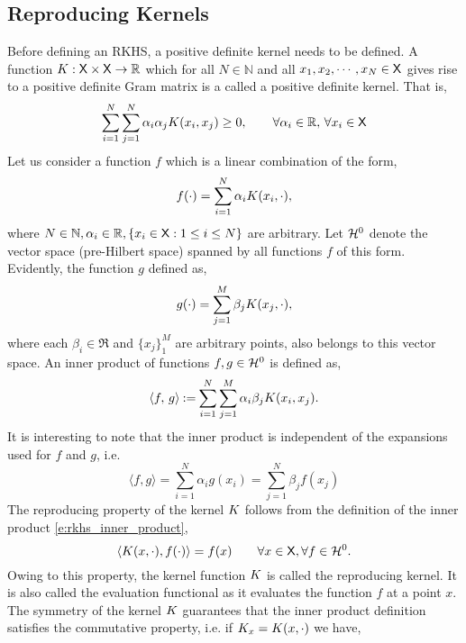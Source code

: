 \subsection{Reproducing Kernels} 
Before defining an RKHS, a positive definite kernel needs to be defined. A function $K : {\sf X} \times {\sf X} \to \mathbb{R}$ which for all $N \in \mathbb{N}$ and all $x_1,x_2,\cdots,x_N \in {\sf X}$ gives rise to a positive definite Gram matrix is a called a positive definite kernel. That is, 
\begin{equation}
\sum_{i=1}^N \sum_{j=1}^N \alpha_i \alpha_j K(x_i,x_j) \geq 0, \qquad \forall \alpha_i \in \mathbb{R}, \, \forall x_i \in {\sf X} 
\end{equation}
Let us consider a function $f$ which is a linear combination of the form,
\begin{equation}
f(\cdot) = \sum_{i=1}^N \alpha_i \Kern(x_i, \cdot),
\label{e:f_rkhs}
\end{equation}
where $N \in \mathbb{N}, \alpha_i \in \mathbb{R}, \{ x_i \in {\sf X}: 1\leq i \leq N \}$ are arbitrary. Let ${\cal H}^0$ denote the vector space (pre-Hilbert space) spanned by all functions $f$ of this form. Evidently, the function $g$ defined as,  
\begin{equation}
g(\cdot) = \sum_{j=1}^M \beta_j \Kern(x_j, \cdot),
\label{e:g_rkhs}
\end{equation}
where each $\beta_i \in \Re$ and $\{x_j\}_1^M$ are arbitrary points, also belongs to this vector space.  An inner product of functions $f,g \in {\cal H}^0$ is defined as,
\begin{equation}
\langle f,\, g \rangle \eqdef \sum_{i=1}^N \sum_{j=1}^M \alpha_i \beta_j \Kern(x_i, x_j).
\label{e:rkhs_inner_product}
\end{equation}
It is interesting to note that the inner product is independent of the expansions used for $f$ and $g$, i.e.
\begin{equation}
\langle f, g \rangle = \sum_{i=1}^N \alpha_i g(x_i) = \sum_{j=1}^N \beta_j f(x_j)
\end{equation}
The reproducing property of the kernel $K$ follows from the definition of the inner product \eqref{e:rkhs_inner_product},
\begin{equation}
\langle \Kern(x,\cdot), f(\cdot)\rangle = f(x) \qquad \forall x \in \state, \forall f \in \clH^0.
\label{e:rkhs_rep_property}
\end{equation}
Owing to this property, the kernel function $K$ is called the reproducing kernel. It is also called the evaluation functional as it evaluates the function $f$ at a point $x$. The symmetry of the kernel $K$ guarantees that the inner product definition satisfies the commutative property, i.e. if $K_x = K(x, \cdot)$ we have,
